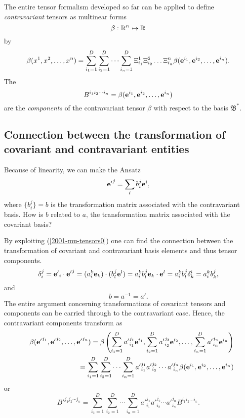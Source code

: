 The entire tensor formalism developed so far can be applied to define {\em contravariant} tensors
as multinear forms
\begin{equation}
\beta:{\Bbb R}^n \mapsto {\Bbb R}
\end{equation}
by
\begin{equation}
\beta ( x^1,x^2,\ldots ,x^n)=
\sum_{i_1=1}^D
\sum_{i_2=1}^D
\cdots
\sum_{i_n=1}^D
\Xi_{i_1}^1 \Xi_{i_2}^2\ldots \Xi_{i_n}^n
\beta ( {\bf e}^{i_1},{\bf e}^{i_2},\ldots ,{\bf e}^{i_n}).
\end{equation}
The
\begin{equation}
B^{{i_1}{i_2}\cdots {i_n}}=\beta ( {\bf e}^{i_1},{\bf e}^{i_2},\ldots ,{\bf e}^{i_n})
\end{equation}
 are the
{\em components} of the contravariant tensor $\beta $ with respect to the basis
${\mathfrak B}^\ast$.

\subsection{Connection between the transformation of covariant and contravariant entities}

Because of linearity, we can make the Ansatz
\begin{equation}
{{\bf e}'}^j=\sum_ib_i^j{\bf e}^i,
\end{equation}
where $\{b_i^j\}=b$ is
the transformation matrix associated with the contravariant basis.
How is $b$ related to $a$,
the transformation matrix associated with the covariant basis?

By exploiting (\ref{2001-mu-tensors0}) one can find the connection between
the transformation of covariant and contravariant basis elements and thus
tensor components.
\begin{equation}
\delta_i^j= {{\bf e}'}_i\cdot {{\bf e}'}^j=(a_i^k{\bf e}_k)\cdot (b_l^j{\bf e}^l)=a_i^kb_l^j {\bf e}_k\cdot {\bf e}^l=a_i^kb_l^j \delta_k^l
=a_i^kb_k^j,
\end{equation}
and
\begin{equation}
b=a^{-1} =a'.
\end{equation}
The entire argument concerning transformations of covariant tensors and components
can be carried through to the contravariant case.
Hence, the contravariant components transform as
\begin{eqnarray}
&&\beta ( {{\bf e}'}^{j_1},{{\bf e}'}^{j_2},\ldots ,{{\bf e}'}^{j_n})=
\beta \left(
\sum_{i_1=1}^D {a'}^{j_1}_{i_1} {\bf e}^{i_1},
\sum_{i_2=1}^D {a'}^{j_2}_{i_2} {\bf e}^{i_2},
\ldots ,
\sum_{i_n=1}^D {a'}^{j_n}_{i_n} {\bf e}^{i_n}
\right)
\nonumber \\&& \quad
=
\sum_{i_1=1}^D\sum_{i_2=1}^D\cdots \sum_{i_n=1}^D
{a'}^{j_1}_{i_1}{a'}^{j_2}_{i_2}\cdots {a'}^{j_n}_{i_n} \beta ( {\bf e}^{i_1},{\bf e}^{i_2},\ldots ,{\bf e}^{i_n})
\end{eqnarray}
or
\begin{equation}
B'^{{j_1}{j_2}\cdots {j_n}}=
\sum_{i_1=1}^D\sum_{i_2=1}^D\cdots \sum_{i_n=1}^D
{a'}^{j_1}_{i_1}{a'}^{j_2}_{i_2}\cdots {a'}^{j_n}_{i_n} B^{i_1 i_2\ldots i_n}.
\end{equation}

